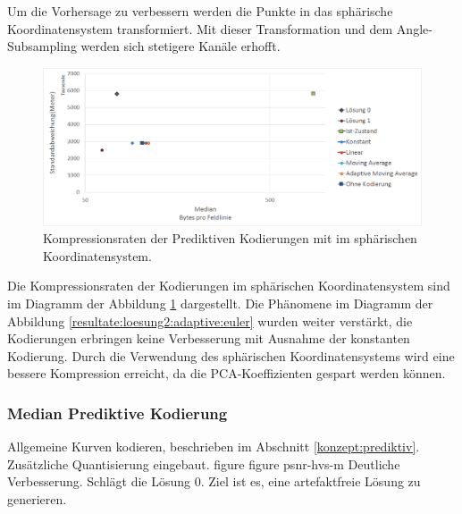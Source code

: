 Um die Vorhersage zu verbessern werden die Punkte in das sphärische Koordinatensystem transformiert. Mit dieser Transformation und dem Angle-Subsampling werden sich stetigere Kanäle erhofft.
\begin{figure}[!htbp]
	\center
	\includegraphics[width=1\textwidth,keepaspectratio]{./pictures/resultate/loesung2/variante1/resultate_spherical.png}
	\caption{Kompressionsraten der Prediktiven Kodierungen mit im sphärischen Koordinatensystem.}
	\label{resultate:loesung2:adaptive:spherial}
\end{figure}
Die Kompressionsraten der Kodierungen im sphärischen Koordinatensystem sind im Diagramm der Abbildung \ref{resultate:loesung2:adaptive:spherial} dargestellt. Die Phänomene im Diagramm der Abbildung \ref{resultate:loesung2:adaptive:euler} wurden weiter verstärkt, die Kodierungen erbringen keine Verbesserung mit Ausnahme der konstanten Kodierung. Durch die Verwendung des sphärischen Koordinatensystems wird eine bessere Kompression erreicht, da die PCA-Koeffizienten gespart werden können.

\subsubsection{Median Prediktive Kodierung}
Allgemeine Kurven kodieren, beschrieben im Abschnitt \ref{konzept:prediktiv}. Zusätzliche Quantisierung eingebaut.
figure
figure psnr-hvs-m
Deutliche Verbesserung. Schlägt die Lösung 0. Ziel ist es, eine artefaktfreie Lösung zu generieren.

